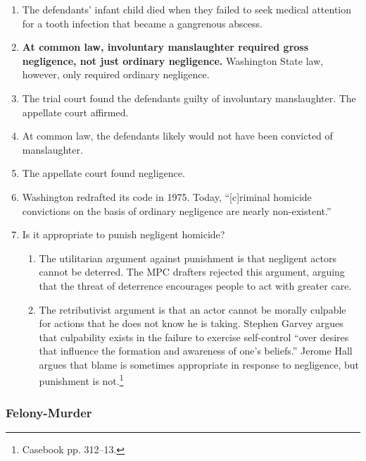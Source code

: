\begin{enumerate}
    \item The defendants' infant child died when they failed to seek medical 
    attention for a tooth infection that became a gangrenous abscess.
    \item \textbf{At common law, involuntary manslaughter required gross 
    negligence, not just ordinary negligence.} Washington State law, however, 
    only required ordinary negligence.
    \item The trial court found the defendants guilty of involuntary 
    manslaughter. The appellate court affirmed.
    \item At common law, the defendants likely would not have been convicted 
    of manslaughter.
    \item The appellate court found negligence.
    \item Washington redrafted its code in 1975. Today, ``[c]riminal homicide 
    convictions on the basis of ordinary negligence are nearly non-existent.''
    \item Is it appropriate to punish negligent homicide?
    \begin{enumerate}
        \item The utilitarian argument against punishment is that negligent 
        actors cannot be deterred. The MPC drafters rejected this argument, 
        arguing that the threat of deterrence encourages people to act with 
        greater care.
        \item The retributivist argument is that an actor cannot be morally 
        culpable for actions that he does not know he is taking. Stephen 
        Garvey argues that culpability exists in the failure to exercise 
        self-control ``over desires that influence the formation and awareness 
        of one's beliefs.'' Jerome Hall argues that blame is sometimes 
        appropriate in response to negligence, but punishment is 
        not.\footnote{Casebook pp. 312--13.}
    \end{enumerate}
\end{enumerate}

\subsubsection{Felony-Murder}

